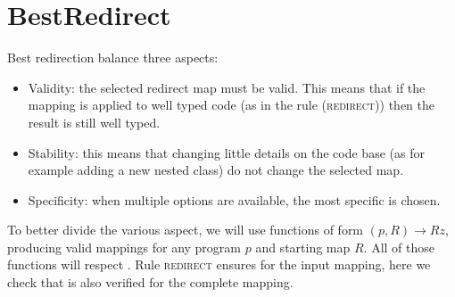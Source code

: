 



\section{BestRedirect}
Best redirection balance three aspects:
\begin{itemize}
\item Validity: the selected redirect map must be valid.
This means that if the mapping is applied to well typed code (as in the rule \textsc{(redirect)}) then the result is still well typed.
\item Stability: this means
that changing little details on the code base (as for example adding a new nested class) do not change the selected map.
\item Specificity: when multiple options are available, the most specific is chosen.
\end{itemize}
To better divide the various aspect, we will use
functions of form $(p,R)\rightarrow Rz$, producing valid mappings
for any program $p$ and starting map $R$.
All of those functions will respect 
.
Rule \textsc{redirect} ensures 
 for the input mapping,
here we check that is also verified for the complete mapping.

